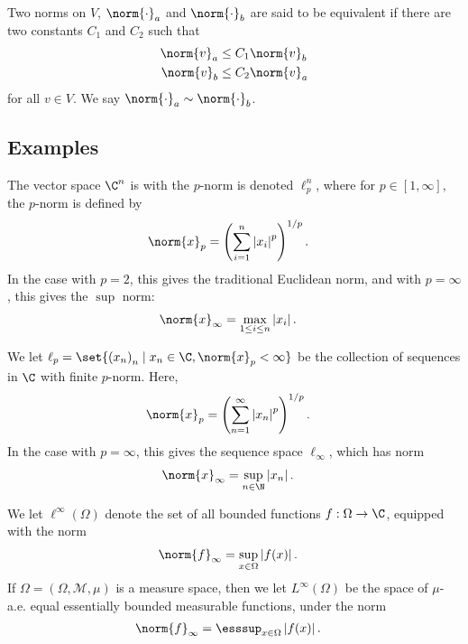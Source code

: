 \documentclass[10pt]{mypackage}
\begin{document}
\begin{definition}
  Two norms on $V$, $\norm{\cdot}_{a}$ and $\norm{\cdot}_{b}$ are said to be equivalent if there are two constants $C_1$ and $C_2$ such that
  \begin{align*}
    \norm{v}_{a} &\leq C_1\norm{v}_b\\
    \norm{v}_{b} &\leq C_2\norm{v}_a
  \end{align*}
  for all $v\in V$. We say $\norm{\cdot}_{a}\sim \norm{\cdot}_{b}$.
\end{definition}
\subsection{Examples}%
\begin{example}
  The vector space $\C^n$ is with the $p$-norm is denoted $\ell_{p}^{n}$, where for $p \in [1,\infty]$, the $p$-norm is defined by
  \begin{align*}
    \norm{x}_{p} &= \left(\sum_{i=1}^{n}\left\vert x_i \right\vert^p\right)^{1/p}.
  \end{align*}
  In the case with $p=2$, this gives the traditional Euclidean norm, and with $p = \infty$, this gives the $\sup$ norm:
  \begin{align*}
    \norm{x}_{\infty} &= \max_{1\leq i \leq n}\left\vert x_i \right\vert.
  \end{align*}
\end{example}
\begin{example}
  We let $\ell_{p} = \set{\left(x_{n}\right)_n\mid x_n\in \C,\norm{x}_p < \infty}$ be the collection of sequences in $\C$ with finite $p$-norm. Here,
  \begin{align*}
    \norm{x}_p &= \left(\sum_{n=1}^{\infty}\left\vert x_n \right\vert^p\right)^{1/p}.
  \end{align*}
  In the case with $p = \infty$, this gives the sequence space $\ell_{\infty}$, which has norm
  \begin{align*}
    \norm{x}_{\infty} &= \sup_{n\in \N}\left\vert x_n \right\vert.
  \end{align*}
\end{example}
\begin{example}
  We let $\ell^{\infty}\left(\Omega\right)$ denote the set of all bounded functions $f: \Omega \rightarrow \C$, equipped with the norm
  \begin{align*}
    \norm{f}_{\infty} &= \sup_{x\in \Omega}\left\vert f(x) \right\vert.
  \end{align*}
  If $\Omega = \left(\Omega,\mathcal{M},\mu\right)$ is a measure space, then we let $L^{\infty}\left(\Omega\right)$ be the space of $\mu$-a.e. equal essentially bounded measurable functions, under the norm
  \begin{align*}
    \norm{f}_{\infty} &= \esssup_{x\in \Omega}\left\vert f(x) \right\vert.
  \end{align*}
\end{example}
\end{document}
